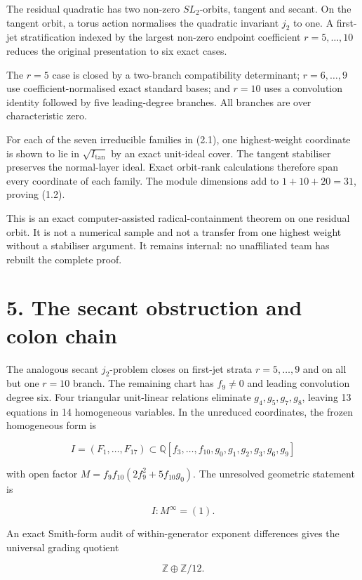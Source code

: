 \documentclass[
  11pt,
]{article}
\begin{document}
The residual quadratic has two non-zero \(SL_2\)-orbits, tangent and
secant. On the tangent orbit, a torus action normalises the quadratic
invariant \(j_2\) to one. A first-jet stratification indexed by the
largest non-zero endpoint coefficient \(r=5,\ldots,10\) reduces the
original presentation to six exact cases.

The \(r=5\) case is closed by a two-branch compatibility determinant;
\(r=6,\ldots,9\) use coefficient-normalised exact standard bases; and
\(r=10\) uses a convolution identity followed by five leading-degree
branches. All branches are over characteristic zero.

For each of the seven irreducible families in (2.1), one highest-weight
coordinate is shown to lie in \(\sqrt{I_{\mathrm{tan}}}\) by an exact
unit-ideal cover. The tangent stabiliser preserves the normal-layer
ideal. Exact orbit-rank calculations therefore span every coordinate of
each family. The module dimensions add to \(1+10+20=31\), proving (1.2).

This is an exact computer-assisted radical-containment theorem on one
residual orbit. It is not a numerical sample and not a transfer from one
highest weight without a stabiliser argument. It remains internal: no
unaffiliated team has rebuilt the complete proof.

\section{5. The secant obstruction and colon
chain}\label{the-secant-obstruction-and-colon-chain}

The analogous secant \(j_2\)-problem closes on first-jet strata
\(r=5,\ldots,9\) and on all but one \(r=10\) branch. The remaining chart
has \(f_9\ne0\) and leading convolution degree six. Four triangular
unit-linear relations eliminate \(g_4,g_5,g_7,g_8\), leaving 13
equations in 14 homogeneous variables. In the unreduced coordinates, the
frozen homogeneous form is

\[
I=(F_1,\ldots,F_{17})\subset
\mathbb Q[f_3,\ldots,f_{10},g_0,g_1,g_2,g_3,g_6,g_9]
\]

with open factor \(M=f_9f_{10}(2f_9^2+5f_{10}g_0)\). The unresolved
geometric statement is

\[
I:M^\infty=(1).
\tag{5.1}
\]

An exact Smith-form audit of within-generator exponent differences gives
the universal grading quotient

\[
\mathbb Z\oplus\mathbb Z/12.
\tag{5.2}
\]
\end{document}
